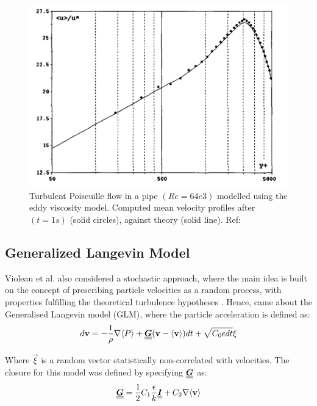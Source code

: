 \begin{figure}[h!]
	\centering
	\includegraphics{Figures/research_papers/violeau2002-eddy-viscosity-result.png}
	\caption{Turbulent Poiseuille flow in a pipe $(Re = 64e3)$ modelled using the eddy viscosity model. Computed mean velocity profiles after $(t=1s)$ (solid circles), against theory (solid line). Ref: \parencite{VIOLEAU2002}}
	\label{fig:violeau2002-eddy-viscosity-result}
\end{figure}

\subsection{Generalized Langevin Model}
Violeau et al. also considered a stochastic approach, where the main idea is built on the concept of prescribing particle velocities as a random process, with properties fulfilling the theoretical turbulence hypotheses \parencite{pope1994lagrangi}. Hence, came about the Generalised Langevin model (GLM), where the particle acceleration is defined as:
\begin{equation}
	d\mathbf{v} = -\frac{1}{\rho} \nabla \langle P \rangle + \underline{\underline{\bm{G}}}(\mathbf{v} - \langle \mathbf{v} \rangle)dt + \sqrt{C_0 \epsilon dt}\mathbf{\xi}
	\label{eq:violeau-glm-particle-accel}
\end{equation}

Where $\Vec{\xi}$ is a random vector statistically non-correlated with velocities. The closure for this model was defined by specifying $\underline{\underline{\bm{G}}}$ as:
\begin{equation}
	\underline{\underline{\bm{G}}} = \frac{1}{2} C_1 \frac{\epsilon}{k}\underline{\underline{\bm{I}}} + C_2 \nabla \langle \mathbf{v} \rangle
\end{equation}

